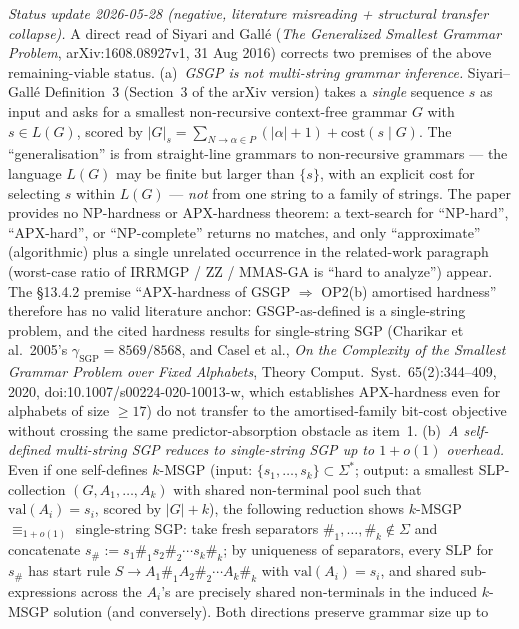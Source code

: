 \documentclass[
]{article}
\begin{document}
\begin{enumerate}
\emph{Status update 2026-05-28 (negative, literature misreading +
structural transfer collapse).} A direct read of Siyari and
Gall\'e (\emph{The Generalized Smallest Grammar Problem},
arXiv:1608.08927v1, 31 Aug 2016) corrects two premises of the
above remaining-viable status. (a)~\emph{GSGP is not multi-string
grammar inference.} Siyari--Gall\'e Definition~3 (Section~3 of
the arXiv version) takes a \emph{single} sequence $s$ as input
and asks for a smallest non-recursive context-free grammar $G$
with $s \in L(G)$, scored by $|G|_s = \sum_{N \to \alpha \in
P}(|\alpha|+1) + \mathrm{cost}(s \mid G)$. The
``generalisation'' is from straight-line grammars to non-recursive
grammars --- the language $L(G)$ may be finite but larger than
$\{s\}$, with an explicit cost for selecting $s$ within $L(G)$
--- \emph{not} from one string to a family of strings. The paper
provides no NP-hardness or APX-hardness theorem: a text-search
for ``NP-hard'', ``APX-hard'', or ``NP-complete'' returns no
matches, and only ``approximate'' (algorithmic) plus a single
unrelated occurrence in the related-work paragraph (worst-case
ratio of IRRMGP / ZZ / MMAS-GA is ``hard to analyze'') appear.
The §13.4.2 premise ``APX-hardness of GSGP $\Rightarrow$ OP2(b)
amortised hardness'' therefore has no valid literature anchor:
GSGP-as-defined is a single-string problem, and the cited
hardness results for single-string SGP (Charikar et al.\ 2005's
$\gamma_{\mathrm{SGP}} = 8569/8568$, and Casel et al., \emph{On
the Complexity of the Smallest Grammar Problem over Fixed
Alphabets}, Theory Comput.\ Syst.\ 65(2):344--409, 2020,
doi:10.1007/s00224-020-10013-w, which establishes APX-hardness
even for alphabets of size $\geq 17$) do not transfer to the
amortised-family bit-cost objective without crossing the same
predictor-absorption obstacle as item~1.
(b)~\emph{A self-defined multi-string SGP reduces to single-string
SGP up to $1+o(1)$ overhead.} Even if one self-defines $k$-MSGP
(input: $\{s_1,\dots,s_k\} \subset \Sigma^*$; output: a smallest
SLP-collection $(G,A_1,\dots,A_k)$ with shared non-terminal pool
such that $\mathrm{val}(A_i)=s_i$, scored by $|G|+k$), the
following reduction shows $k$-MSGP $\equiv_{1+o(1)}$ single-string
SGP: take fresh separators $\#_1,\dots,\#_k \notin \Sigma$ and
concatenate $s_\# := s_1 \#_1 s_2 \#_2 \cdots s_k \#_k$; by
uniqueness of separators, every SLP for $s_\#$ has start rule
$S \to A_1 \#_1 A_2 \#_2 \cdots A_k \#_k$ with $\mathrm{val}(A_i)
= s_i$, and shared sub-expressions across the $A_i$'s are
precisely shared non-terminals in the induced $k$-MSGP solution
(and conversely). Both directions preserve grammar size up to

\end{enumerate}
\end{document}
